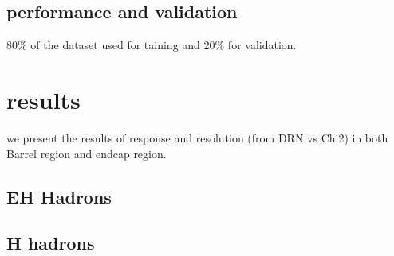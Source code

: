 \subsection{performance and validation}
80\% of the dataset used for taining and 20\% for validation.

\section{results}
we present the results of response and resolution (from DRN vs Chi2) in  both Barrel region and endcap region.
\subsection{EH Hadrons}
\subsection{H hadrons}
